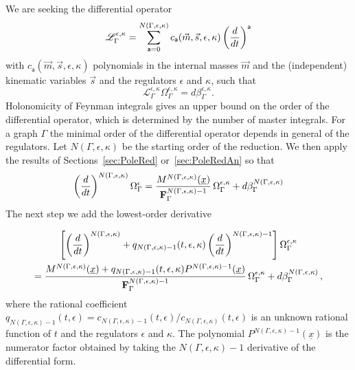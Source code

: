 \documentclass[a4paper,12pt]{article}
\numberwithin{equation}{section}
\numberwithin{figure}{section}
\begin{document}
We are seeking the differential operator 
\begin{equation}\label{e:PFgeneric}
  \mathscr{L}_\Gamma^{\epsilon,\kappa}=\sum_{\mathsf{a}=0}^{N(\Gamma,\epsilon,\kappa)}
  c_{\mathsf{a}}(\vec m,\vec s,\epsilon,\kappa) \left(d\over dt\right)^{\mathsf{a}}
\end{equation}
with $c_{\mathsf{a}}(\vec m,\vec s,\epsilon,\kappa)$ polynomials in the internal masses
$\vec m$  and the (independent) kinematic variables $\vec s$  and the
regulators $\epsilon$  and $\kappa$, such that
\begin{equation}
     \mathscr{L}_\Gamma^{\epsilon,\kappa} \Omega_\Gamma^{\epsilon,\kappa}= d\beta^{\epsilon,\kappa}_\Gamma.
   \end{equation}
%
Holonomicity of Feynman integrals gives an upper bound on the order of the differential operator, which is  determined by
 the number of master
integrals. For a graph $\Gamma$ the minimal order of the differential operator depends in general of the regulators.
Let $N(\Gamma,\epsilon,\kappa)$  be the starting order of the
reduction.  We then apply the results of Sections~\ref{sec:PoleRed}
or~\ref{sec:PoleRedAn} so that
%
\begin{equation}\label{e:step1}
\left(d\over dt\right)^{N(\Gamma,\epsilon,\kappa)} \Omega_\Gamma^\epsilon= {M^{
      N(\Gamma,\epsilon,\kappa)}(\underline x)\over
    \textbf{F}_\Gamma^{N(\Gamma,\epsilon,\kappa)-1}
  } \,\Omega_\Gamma^{\epsilon,\kappa}+ d\beta_\Gamma^{N(\Gamma,\epsilon,\kappa)}  
\end{equation}
%
The next step we add the lowest-order derivative

\begin{multline}\label{e:step2}
\left[\left(d\over dt\right)^{N(\Gamma,\epsilon,\kappa)}
  +q_{N(\Gamma,\epsilon, \kappa)-1}(t,\epsilon,\kappa) \left(d\over dt\right)^{N(\Gamma,\epsilon,\kappa)-1}\right] \Omega_\Gamma^{\epsilon,\kappa}\cr= {M^{
      N(\Gamma,\epsilon,\kappa)}(\underline x)+q_{N(\Gamma,\epsilon,\kappa)-1}(t,\epsilon,\kappa)
    P^{N(\Gamma,\epsilon,\kappa)-1}(\underline x) \over
    \textbf{F}_\Gamma^{N(\Gamma,\epsilon,\kappa)-1}
  }\,\Omega_\Gamma^{\epsilon,\kappa}+ d\beta_\Gamma^{N(\Gamma,\epsilon,\kappa)}\, ,  
\end{multline}
where the rational coefficient
$q_{N(\Gamma,\epsilon,\kappa)-1}(t,\epsilon)=c_{N(\Gamma,\epsilon,\kappa)-1}(t,\epsilon)/c_{N(\Gamma,\epsilon,\kappa)}(t,\epsilon)$
is an unknown rational function of $t$ and  the regulators $\epsilon$
and $\kappa$. 
The polynomial $ P^{N(\Gamma,\epsilon,\kappa)-1}(\underline x) $
is the numerator factor obtained by taking the $N(\Gamma,\epsilon,\kappa)-1$
derivative of the differential form.
\end{document}

